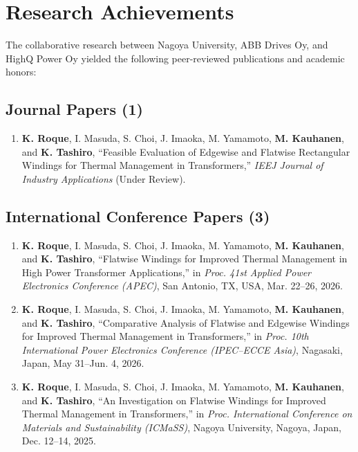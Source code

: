 \section*{Research Achievements}
The collaborative research between Nagoya University, ABB Drives Oy, and HighQ Power Oy yielded the following peer-reviewed publications and academic honors:
\begin{singlespace}
\subsection*{Journal Papers (1)}
\begin{singlespace}
\begin{enumerate}
    \item \textbf{K. Roque}, I. Masuda, S. Choi, J. Imaoka, M. Yamamoto, \textbf{M. Kauhanen}, and \textbf{K. Tashiro}, ``Feasible Evaluation of Edgewise and Flatwise Rectangular Windings for Thermal Management in Transformers,'' \textit{IEEJ Journal of Industry Applications} (Under Review).
\end{enumerate}
\end{singlespace}

\subsection*{International Conference Papers (3)}
\begin{singlespace}
\begin{enumerate}
    \item \textbf{K. Roque}, I. Masuda, S. Choi, J. Imaoka, M. Yamamoto, \textbf{M. Kauhanen}, and \textbf{K. Tashiro}, ``Flatwise Windings for Improved Thermal Management in High Power Transformer Applications,'' in \textit{Proc. 41st Applied Power Electronics Conference (APEC)}, San Antonio, TX, USA, Mar. 22--26, 2026.
    \item \textbf{K. Roque}, I. Masuda, S. Choi, J. Imaoka, M. Yamamoto, \textbf{M. Kauhanen}, and \textbf{K. Tashiro}, ``Comparative Analysis of Flatwise and Edgewise Windings for Improved Thermal Management in Transformers,'' in \textit{Proc. 10th International Power Electronics Conference (IPEC--ECCE Asia)}, Nagasaki, Japan, May 31--Jun. 4, 2026.
    \item \textbf{K. Roque}, I. Masuda, S. Choi, J. Imaoka, M. Yamamoto, \textbf{M. Kauhanen}, and \textbf{K. Tashiro}, ``An Investigation on Flatwise Windings for Improved Thermal Management in Transformers,'' in \textit{Proc. International Conference on Materials and Sustainability (ICMaSS)}, Nagoya University, Nagoya, Japan, Dec. 12--14, 2025.
\end{enumerate}
\end{singlespace}

\end{singlespace}
